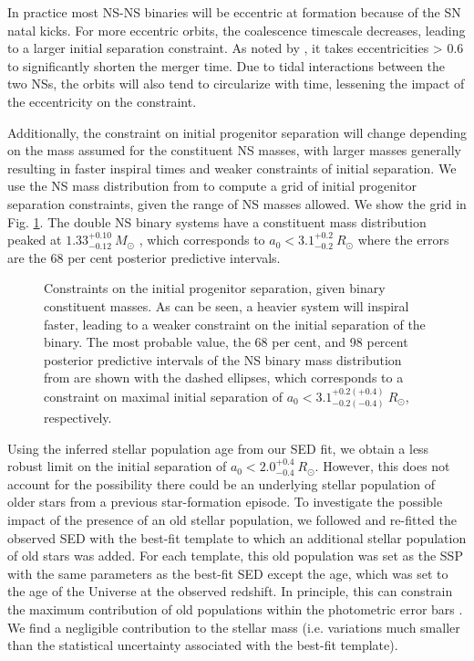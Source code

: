 \documentclass[referee]{aa}
\begin{document}
In practice most NS-NS binaries will be eccentric at formation because of the SN
natal kicks. For more eccentric orbits, the coalescence timescale decreases,
leading to a larger initial separation constraint. As noted by
\citet{Postnov2014}, it takes eccentricities > 0.6 to significantly shorten the
merger time. Due to tidal interactions between the two NSs, the orbits will also
tend to circularize with time, lessening the impact of the eccentricity on the
constraint.

Additionally, the constraint on initial progenitor separation will change
depending on the mass assumed for the constituent NS masses, with larger masses
generally resulting in faster inspiral times and weaker constraints of initial
separation. We use the NS mass distribution from \citet{Kiziltan2013} to compute
a grid of initial progenitor separation constraints, given the range of NS
masses allowed. We show the grid in Fig. \ref{fig:prog_sep}. The double NS
binary systems have a constituent mass distribution peaked at
$1.33^{+0.10}_{-0.12}~M_\odot$ \citep{Kiziltan2013}, which corresponds to  $a_0 <
3.1^{+0.2}_{-0.2}~R_\odot$ where the errors are the 68 per cent posterior
predictive intervals.

\begin{figure}
	\centering
	\caption{Constraints on the initial progenitor separation, given binary constituent masses. As can be seen, a heavier system will inspiral faster, leading to a weaker constraint on the initial separation of the binary. The most probable value, the 68 per cent, and 98 percent posterior predictive intervals of the NS binary mass distribution from \citet{Kiziltan2013} are shown with the dashed ellipses, which corresponds to a constraint on maximal initial separation of $a_0 <3.1^{+0.2(+0.4)}_{-0.2(-0.4)}~R_\odot$, respectively.}
	\label{fig:prog_sep}
\end{figure}

Using the inferred stellar population age from our SED fit, we obtain a less
robust limit on the initial separation of $a_0 < 2.0^{+0.4}_{-0.4}~R_\odot$.
However, this does not account for the possibility there could be an underlying
stellar population of older stars from a previous star-formation episode. To
investigate the possible impact of the presence of an old stellar population, we
followed \citet{Papovich2001} and re-fitted the observed SED with the best-fit
template to which an additional stellar population of old stars was added. For
each template, this old population was set as the SSP with the same parameters as
the best-fit SED except the age, which was set to the age of the Universe at
the observed redshift. In principle, this can constrain the maximum contribution
of old populations within the photometric error bars \citep[see][for
details]{Papovich2001}. We find a negligible contribution to the stellar mass
(i.e. variations much smaller than the statistical uncertainty associated with
the best-fit template).
\end{document}
